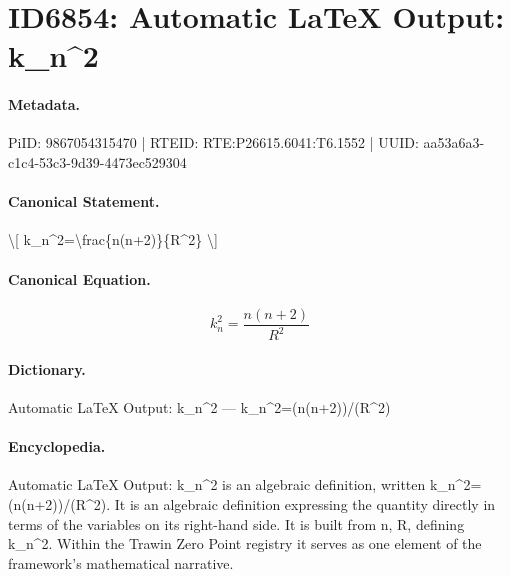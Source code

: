 \section*{ID6854: Automatic LaTeX Output: k\_n\textasciicircum{}2}
\paragraph{Metadata.}
PiID: 9867054315470 | RTEID: RTE:P26615.6041:T6.1552 | UUID: aa53a6a3-c1c4-53c3-9d39-4473ec529304

\paragraph{Canonical Statement.}
\textbackslash{}[ k\_n\textasciicircum{}2=\textbackslash{}frac\{n(n+2)\}\{R\textasciicircum{}2\} \textbackslash{}]

\paragraph{Canonical Equation.}
\[
k_n^2=\frac{n(n+2)}{R^2}
\]

\paragraph{Dictionary.}
Automatic LaTeX Output: k\_n\textasciicircum{}2 — k\_n\textasciicircum{}2=(n(n+2))/(R\textasciicircum{}2)

\paragraph{Encyclopedia.}
Automatic LaTeX Output: k\_n\textasciicircum{}2 is an algebraic definition, written k\_n\textasciicircum{}2=(n(n+2))/(R\textasciicircum{}2). It is an algebraic definition expressing the quantity directly in terms of the variables on its right-hand side. It is built from n, R, defining k\_n\textasciicircum{}2. Within the Trawin Zero Point registry it serves as one element of the framework's mathematical narrative.
